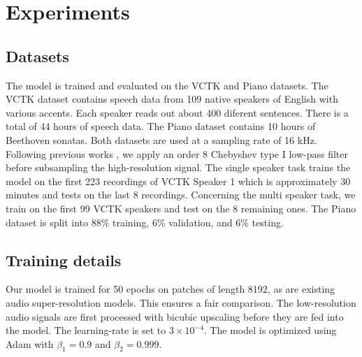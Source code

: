 \documentclass{article}
\begin{document}
\section{Experiments}
\label{sec:experiments}
\subsection{Datasets}
The model is trained and evaluated on the VCTK \cite{yamagishi2012english} and Piano \cite{mehri2016samplernn} datasets. The VCTK dataset contains speech data from 109 native speakers of English with various accents. Each speaker reads out about 400 diferent sentences. There is a total of 44 hours of speech data. The Piano dataset contains 10 hours of Beethoven sonatas. Both datasets are used at a sampling rate of 16 kHz. Following previous works \cite{kuleshov2017audio,birnbaum2019temporal}, we apply an order 8 Chebyshev type I low-pass filter before subsampling the high-resolution signal. The single speaker task trains the model on
the first 223 recordings of VCTK Speaker 1 which is approximately 30 minutes and tests on the last 8 recordings. Concerning the multi speaker task, we train on the first 99 VCTK speakers and test on the 8 remaining ones. The Piano dataset is split into
88\% training, 6\% validation, and 6\% testing.

\subsection{Training details}
Our model is trained  for 50 epochs on patches of length 8192, as are existing audio super-resolution models. This ensures a fair comparison. The low-resolution audio signals are first processed with bicubic upscaling before they are fed into the model. The learning-rate is set to $3 \times 10^{-4}$. The model is optimized using Adam \cite{kingma2014adam} with $\beta_1=0.9$ and
$\beta_2 = 0.999$. 
\end{document}
